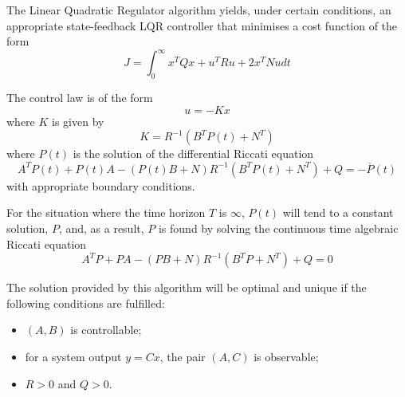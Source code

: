 \par The Linear Quadratic Regulator algorithm yields, under certain conditions, an appropriate state-feedback LQR controller that minimises a cost function of the form
\begin{equation}
    \label{eq:quadratic_cost}
    J = \int_0^\infty x^T Q x + u^T R u + 2x^T N u dt
\end{equation}

\par The control law is of the form
\begin{equation}
    \label{eq:feedback}
    u = -Kx
\end{equation}
where $K$ is given by
\begin{equation}
    \label{eq:k_expression}
    K = R^{-1} (B^T P(t) + N^T)
\end{equation}
where $P(t)$ is the solution of the differential Riccati equation \cite{riccati1724animadversiones}
\begin{equation}
    \label{eq:p_diff_expression}
    A^T P(t) + P(t) A - (P(t) B + N) R^{-1} (B^T P(t) + N^T) + Q = - \overline{P}(t)
\end{equation}
with appropriate boundary conditions.

\par For the situation where the time horizon $T$ is $\infty$, $P(t)$ will tend to a constant solution, $P$, and, as a result, $P$ is found by solving the continuous time algebraic Riccati equation 
\begin{equation}
    \label{eq:p_expression}
    A^T P + PA - (PB + N) R^{-1} (B^T P + N^T) + Q = 0
\end{equation}


\par The solution provided by this algorithm will be optimal and unique if the following conditions are fulfilled:
\begin{itemize}
    \item $(A,B)$ is controllable;
    \item for a system output $y = C x$, the pair $(A,C)$ is observable;
    \item $R>0$ and $Q>0$.
\end{itemize}


